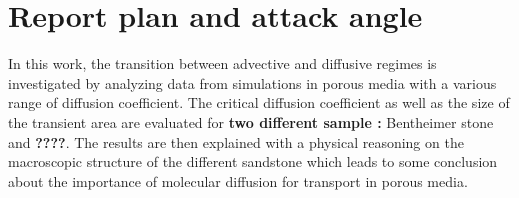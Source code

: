 \section{Report plan and attack angle}
In this work, the transition between advective and diffusive regimes is investigated by analyzing data from simulations in porous media with a various range of diffusion coefficient. The critical diffusion coefficient as well as the size of the transient area are evaluated for \textbf{two different sample :} Bentheimer stone and \textbf{????}.
The results are then explained with a physical reasoning on the macroscopic structure of the different sandstone which leads to some conclusion about the importance of molecular diffusion for transport in porous media.

